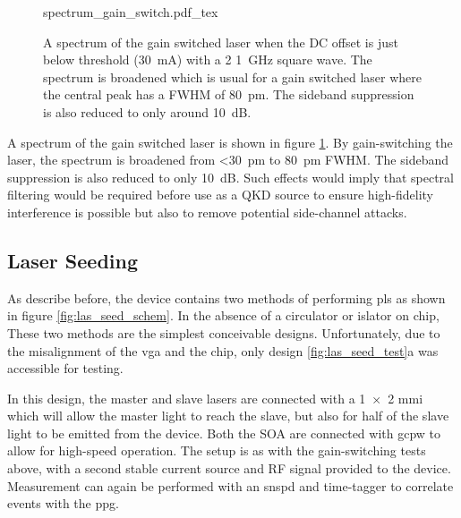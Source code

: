 \begin{figure}[tp]
	\centering
	\small	
	\def\svgwidth{0.9\textwidth} 
	{spectrum_gain_switch.pdf_tex}
	\caption[Spectrum of the gain switched laser]{A spectrum of the gain switched laser when the DC offset is just below threshold (\SI{30}{mA}) with a \SI{2}{\Vpp} \SI{1}{\GHz} square wave. The spectrum is broadened which is usual for a gain switched laser where the central peak has a \ac{FWHM} of \SI{80}{pm}. The sideband suppression is also reduced to only around \SI{10}{dB}.}
	\label{fig:gain_switch_spectrum}
\end{figure}

A spectrum of the gain switched laser is shown in figure \ref{fig:gain_switch_spectrum}. By gain-switching the laser, the spectrum is broadened from \SI{<30}{pm} to \SI{80}{pm} \ac{FWHM}. The sideband suppression is also reduced to only \SI{10}{dB}. Such effects would imply that spectral filtering would be required before use as a \ac{QKD} source to ensure high-fidelity interference is possible but also to remove potential side-channel attacks.

\subsection{Laser Seeding}

As describe before, the device contains two methods of performing \ac{pls} as shown in figure \ref{fig:las_seed_schem}. In the absence of a circulator or islator on chip, These two methods are the simplest conceivable designs. Unfortunately, due to the misalignment of the \ac{vga} and the chip, only design \ref{fig:las_seed_test}a was accessible for testing. 

In this design, the master and slave lasers are connected with a \num{1x2} \ac{mmi} which will allow the master light to reach the slave, but also for half of the slave light to be emitted from the device. Both the \ac{SOA} are connected with \ac{gcpw} to allow for high-speed operation. The setup is as with the gain-switching tests above, with a second stable current source and RF signal provided to the device. Measurement can again be performed with an \ac{snspd} and time-tagger to correlate events with the \ac{ppg}.



